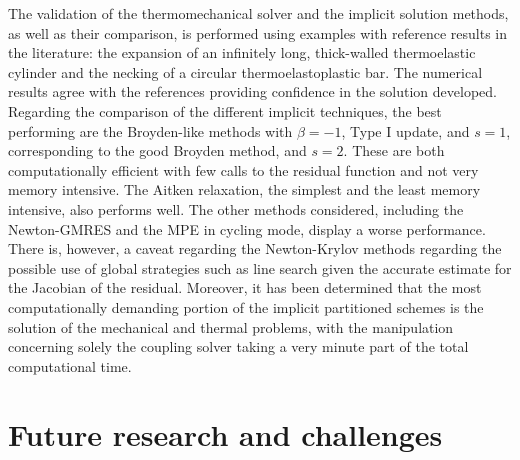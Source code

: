 The validation of the thermomechanical solver and the implicit solution methods, as well as their comparison, is performed using examples with reference results in the literature: the expansion of an infinitely long, thick-walled thermoelastic cylinder and the necking of a circular thermoelastoplastic bar.
The numerical results agree with the references providing confidence in the solution developed.
Regarding the comparison of the different implicit techniques, the best performing are the Broyden-like methods with \(\beta=-1\), Type I update, and \(s=1\), corresponding to the good Broyden method, and \(s=2\).
These are both computationally efficient with few calls to the residual function and not very memory intensive.
The Aitken relaxation, the simplest and the least memory intensive, also performs well.
The other methods considered, including the Newton-GMRES and the MPE in cycling mode, display a worse performance.
There is, however, a caveat regarding the Newton-Krylov methods regarding the possible use of global strategies such as line search given the accurate estimate for the Jacobian of the residual.
Moreover, it has been determined that the most computationally demanding portion of the implicit partitioned schemes is the solution of the mechanical and thermal problems, with the manipulation concerning solely the coupling solver taking a very minute part of the total computational time.

\section{Future research and challenges}

